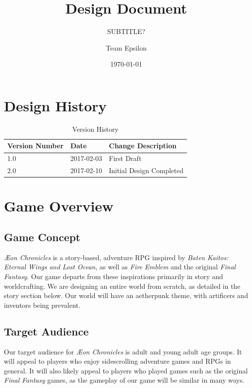 \documentclass[12pt,titlepage]{article}
\title{\gametitle Design Document}
\subtitle{SUBTITLE?}
\author{Team Epsilon}
\date{\today}
\newcommand\gametitle{\textit{\AE on Chronicles}\xspace}
\begin{document}
\maketitle

\tableofcontents
\newpage
\listoffigures
\newpage
\listoftables


\newpage
\section{Design History}
\begin{table}[H]
    \caption{Version History}
    \label{tbl:version_history}
    \centering
    \begin{tabularx}{\linewidth}{| l | l || X |}
        \hline
        \textbf{Version Number} & \textbf{Date} & \textbf{Change Description} \\
        \hline\hline
        1.0 & 2017-02-03 & First Draft \\
        \hline
        2.0 & 2017-02-10 & Initial Design Completed \\
        \hline
    \end{tabularx}
\end{table}

\newpage
\section{Game Overview}
\subsection{Game Concept}
\gametitle is a story-based, adventure RPG inspired by \textit{Baten Kaitos:
Eternal Wings and Lost Ocean}, as well as \textit{Fire Emblem} and the original
\textit{Final Fantasy}. Our game departs from these inspirations primarily
in story and worldcrafting. We are designing an entire world from scratch, as
detailed in the story section below. Our world will have an aetherpunk theme,
with artificers and inventors being prevalent.

\subsection{Target Audience}
Our target audience for \gametitle is adult and young adult age groups. It will
appeal to players who enjoy sidescrolling adventure games and RPGs in general.
It will also likely appeal to players who played games such as the original
\textit{Final Fantasy} games, as the gameplay of our game will be similar in
many ways.
\end{document}
